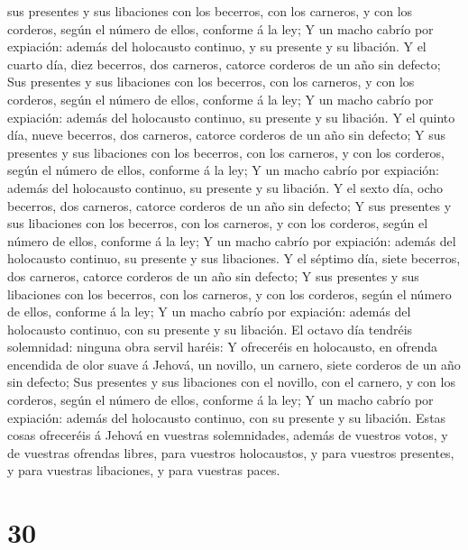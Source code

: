 sus presentes y sus libaciones con los becerros, con los carneros, y con
los corderos, según el número de ellos, conforme á la ley;
 Y un macho cabrío por expiación: además del holocausto
continuo, y su presente y su libación.  Y el cuarto día,
diez becerros, dos carneros, catorce corderos de un año sin defecto;
 Sus presentes y sus libaciones con los becerros, con los
carneros, y con los corderos, según el número de ellos, conforme á la
ley;  Y un macho cabrío por expiación: además del
holocausto continuo, su presente y su libación.  Y el
quinto día, nueve becerros, dos carneros, catorce corderos de un año sin
defecto;  Y sus presentes y sus libaciones con los
becerros, con los carneros, y con los corderos, según el número de
ellos, conforme á la ley;  Y un macho cabrío por
expiación: además del holocausto continuo, su presente y su libación.
 Y el sexto día, ocho becerros, dos carneros, catorce
corderos de un año sin defecto;  Y sus presentes y sus
libaciones con los becerros, con los carneros, y con los corderos, según
el número de ellos, conforme á la ley;  Y un macho cabrío
por expiación: además del holocausto continuo, su presente y sus
libaciones.  Y el séptimo día, siete becerros, dos
carneros, catorce corderos de un año sin defecto;  Y sus
presentes y sus libaciones con los becerros, con los carneros, y con los
corderos, según el número de ellos, conforme á la ley;  Y
un macho cabrío por expiación: además del holocausto continuo, con su
presente y su libación.  El octavo día tendréis
solemnidad: ninguna obra servil haréis:  Y ofreceréis en
holocausto, en ofrenda encendida de olor suave á Jehová, un novillo, un
carnero, siete corderos de un año sin defecto;  Sus
presentes y sus libaciones con el novillo, con el carnero, y con los
corderos, según el número de ellos, conforme á la ley;  Y
un macho cabrío por expiación: además del holocausto continuo, con su
presente y su libación.  Estas cosas ofreceréis á Jehová
en vuestras solemnidades, además de vuestros votos, y de vuestras
ofrendas libres, para vuestros holocaustos, y para vuestros presentes, y
para vuestras libaciones, y para vuestras paces. 

\hypertarget{section-29}{%
\section{30}\label{section-29}}

